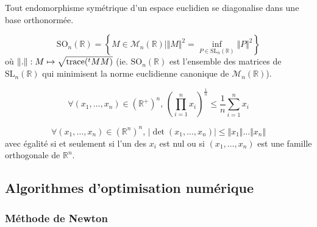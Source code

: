   \begin{application}
    Tout endomorphisme symétrique d'un espace euclidien se diagonalise dans une base orthonormée.
  \end{application}


  \begin{application}
    \[ \mathrm{SO}_n(\mathbb{R}) = \left\{ M \in \mathcal{M}_n(\mathbb{R}) \mid \Vert M \Vert^2 = \inf_{P \in \mathrm{SL}_n(\mathbb{R})} \Vert P \Vert^2 \right\} \]
    où $\Vert . \Vert : M \mapsto \sqrt{\operatorname{trace}(\mathstrut ^t MM)}$ (ie. $\mathrm{SO}_n(\mathbb{R})$ est l'ensemble des matrices de $\mathrm{SL}_n(\mathbb{R})$ qui minimisent la norme euclidienne canonique de $\mathcal{M}_n(\mathbb{R})$).
  \end{application}


  \begin{application}
    \[ \forall (x_1, \dots, x_n) \in (\mathbb{R}^+)^n, \, \left( \prod_{i=1}^{n} x_i \right)^{\frac{1}{n}} \leq \frac{1}{n} \sum_{i=1}^n x_i \]
  \end{application}


  \begin{application}
    \[ \forall (x_1, \dots, x_n) \in (\mathbb{R}^n)^n, \, \vert \det(x_1, \dots, x_n) \vert \leq \Vert x_1 \Vert \dots \Vert x_n \Vert \]
    avec égalité si et seulement si l'un des $x_i$ est nul ou si $(x_1, \dots, x_n)$ est une famille orthogonale de $\mathbb{R}^n$.
  \end{application}

  \subsection{Algorithmes d'optimisation numérique}

  \subsubsection{Méthode de Newton}


